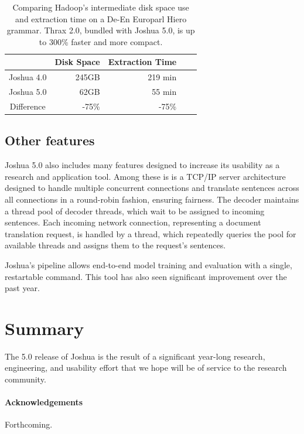 \documentclass[11pt]{article}
\begin{document}
\begin{table}[t]
  \begin{center}
    \begin{tabular}{|c|r|r|r|r|}
      \hline
    & Disk Space & Extraction Time \\
      \hline
      \hline
      Joshua 4.0 & 245GB & 219 min \\
      \hline
      Joshua 5.0 & 62GB  & 55 min\\
      \hline
      \hline
      Difference & -75\% & -75\% \\
      \hline
    \end{tabular}
  \end{center}
  \caption{Comparing Hadoop's intermediate disk space use and extraction time on a
    De-En Europarl Hiero grammar. Thrax 2.0, bundled with Joshua 5.0,
    is up to 300\% faster and more compact.}
  \label{tab-thrax-speed}
\end{table}

\subsection{Other features}

Joshua 5.0 also includes many features designed to increase its
usability as a research and application tool. Among these is is a
TCP/IP server architecture designed to handle multiple concurrent
connections and translate sentences across all connections in a
round-robin fashion, ensuring fairness.  The decoder maintains a
thread pool of decoder threads, which wait to be assigned to incoming
sentences. Each incoming network connection, representing a document
translation request, is handled by a thread, which repeatedly queries
the pool for available threads and assigns them to the request's
sentences.

Joshua's pipeline allows end-to-end model training and evaluation with
a single, restartable command. This tool has also seen significant
improvement over the past year.

\section{Summary}

The 5.0 release of Joshua is the result of a significant year-long
research, engineering, and usability effort that we hope will be of
service to the research community.  

\paragraph{Acknowledgements}

Forthcoming.




\end{document}
